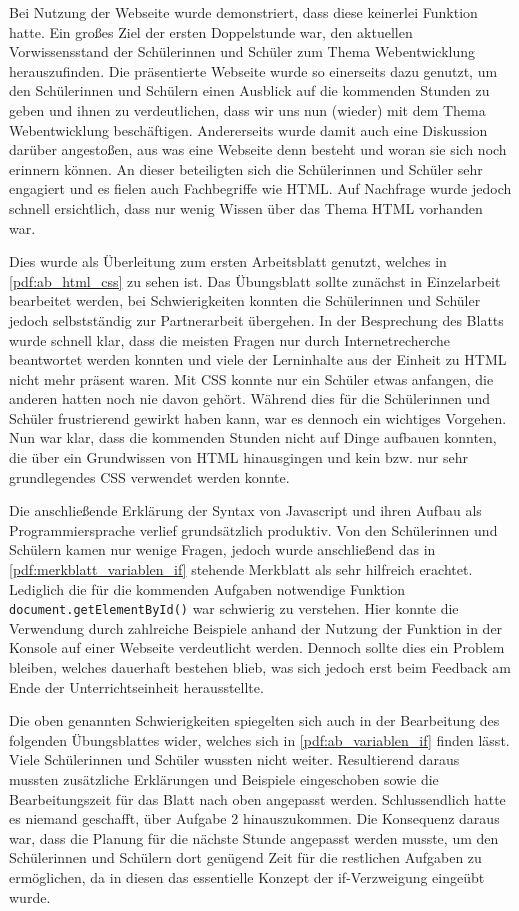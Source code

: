 Bei Nutzung der Webseite wurde demonstriert, dass diese keinerlei Funktion hatte.
Ein großes Ziel der ersten Doppelstunde war, den aktuellen Vorwissensstand der Schülerinnen und Schüler zum Thema Webentwicklung herauszufinden.
Die präsentierte Webseite wurde so einerseits dazu genutzt, um den Schülerinnen und Schülern einen Ausblick auf die kommenden Stunden zu geben und ihnen zu verdeutlichen, dass wir uns nun (wieder) mit dem Thema Webentwicklung beschäftigen.
Andererseits wurde damit auch eine Diskussion darüber angestoßen, aus was eine Webseite denn besteht und woran sie sich noch erinnern können.
An dieser beteiligten sich die Schülerinnen und Schüler sehr engagiert und es fielen auch Fachbegriffe wie HTML.
Auf Nachfrage wurde jedoch schnell ersichtlich, dass nur wenig Wissen über das Thema HTML vorhanden war.

Dies wurde als Überleitung zum ersten Arbeitsblatt genutzt, welches in \autoref{pdf:ab_html_css} zu sehen ist.
Das Übungsblatt sollte zunächst in Einzelarbeit bearbeitet werden, bei Schwierigkeiten konnten die Schülerinnen und Schüler jedoch selbstständig zur Partnerarbeit übergehen.
In der Besprechung des Blatts wurde schnell klar, dass die meisten Fragen nur durch Internetrecherche beantwortet werden konnten und viele der Lerninhalte aus der Einheit zu HTML nicht mehr präsent waren.
Mit CSS konnte nur ein Schüler etwas anfangen, die anderen hatten noch nie davon gehört.
Während dies für die Schülerinnen und Schüler frustrierend gewirkt haben kann, war es dennoch ein wichtiges Vorgehen.
Nun war klar, dass die kommenden Stunden nicht auf Dinge aufbauen konnten, die über ein Grundwissen von HTML hinausgingen und kein bzw. nur sehr grundlegendes CSS verwendet werden konnte.

Die anschließende Erklärung der Syntax von Javascript und ihren Aufbau als Programmiersprache verlief grundsätzlich produktiv.
Von den Schülerinnen und Schülern kamen nur wenige Fragen, jedoch wurde anschließend das in \autoref{pdf:merkblatt_variablen_if} stehende Merkblatt als sehr hilfreich erachtet.
Lediglich die für die kommenden Aufgaben notwendige Funktion \texttt{document.getElementById()} war schwierig zu verstehen.
Hier konnte die Verwendung durch zahlreiche Beispiele anhand der Nutzung der Funktion in der Konsole auf einer Webseite verdeutlicht werden.
Dennoch sollte dies ein Problem bleiben, welches dauerhaft bestehen blieb, was sich jedoch erst beim Feedback am Ende der Unterrichtseinheit herausstellte.

Die oben genannten Schwierigkeiten spiegelten sich auch in der Bearbeitung des folgenden Übungsblattes wider, welches sich in \autoref{pdf:ab_variablen_if} finden lässt.
Viele Schülerinnen und Schüler wussten nicht weiter.
Resultierend daraus mussten zusätzliche Erklärungen und Beispiele eingeschoben sowie die Bearbeitungszeit für das Blatt nach oben angepasst werden.
Schlussendlich hatte es niemand geschafft, über Aufgabe 2 hinauszukommen.
Die Konsequenz daraus war, dass die Planung für die nächste Stunde angepasst werden musste, um den Schülerinnen und Schülern dort genügend Zeit für die restlichen Aufgaben zu ermöglichen, da in diesen das essentielle Konzept der if-Verzweigung eingeübt wurde.

